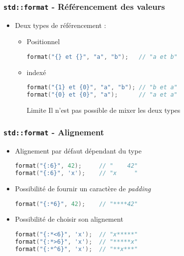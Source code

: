 \documentclass[C++.tex]{subfiles}
\begin{document}
\begin{frame}[fragile]
	\frametitle{\lstinline|std::format| - Référencement des valeurs}
	\begin{itemize}
		\item Deux types de référencement :
		\begin{itemize}
			\item Positionnel
	
			\begin{lstlisting}[language=C++]
format("{} et {}", "a", "b"); 	// "a et b"\end{lstlisting}
	
			\item indexé
	
			\begin{lstlisting}[language=C++]
format("{1} et {0}", "a", "b"); // "b et a"
format("{0} et {0}", "a");      // "a et a"\end{lstlisting}
	
	
			\begin{alertblock}{Limite}
				Il n'est pas possible de mixer les deux types
			\end{alertblock}
		\end{itemize}
	\end{itemize}
\end{frame}

\begin{frame}[fragile]
	\frametitle{\lstinline|std::format| - Alignement}
	\begin{itemize}
		\item Alignement par défaut dépendant du type

			\begin{lstlisting}[language=C++]
format("{:6}", 42);    	// "    42"
format("{:6}", 'x');   	// "x     "\end{lstlisting}

		\item Possibilité de fournir un caractère de \textit{padding}

			\begin{lstlisting}[language=C++]
format("{:*6}", 42);    // "****42"\end{lstlisting}

		\item Possibilité de choisir son alignement

			\begin{lstlisting}[language=C++]
format("{:*<6}", 'x'); 	// "x*****"
format("{:*>6}", 'x'); 	// "*****x"
format("{:*^6}", 'x'); 	// "**x***"\end{lstlisting}
	\end{itemize}
\end{frame}
\end{document}
